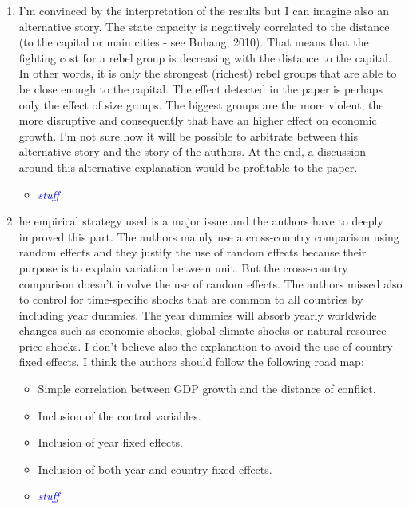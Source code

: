 \documentclass[12pt,onesided,fullpage]{amsart}
\begin{document}
\begin{enumerate}

\item  I’m convinced by the interpretation of the results but I can imagine also an alternative story. The state capacity is negatively correlated to the distance (to the capital or main cities - see Buhaug, 2010). That means that the fighting cost for a rebel group is decreasing with the distance to the capital. In other words, it is only the strongest (richest) rebel groups that are able to be close enough to the capital. The effect detected in the paper is perhaps only the effect of size groups. The biggest groups are the more violent, the more disruptive and consequently that have an higher effect on economic growth. I’m not sure how it will be possible to arbitrate between this alternative story and the story of the authors. At the end, a discussion around this alternative explanation would be profitable to the paper.

\begin{itemize}
\item \textcolor{blue}{\emph{stuff}}
\end{itemize}

\item he empirical strategy used is a major issue and the authors have to deeply improved this part. The authors mainly use a cross-country comparison using random effects and they justify the use of random effects because their purpose is to explain variation between unit. But the cross-country comparison doesn’t involve the use of random effects. The authors missed also to control for time-specific shocks that are common to all countries by including year dummies. The year dummies will absorb yearly worldwide changes such as economic shocks, global climate shocks or natural resource price shocks. I don’t believe also the explanation to avoid the use of country fixed effects. I think the authors should follow the following road map:
\begin{itemize}
\item Simple correlation between GDP growth and the distance of conflict.
\item Inclusion of the control variables.
\item Inclusion of year fixed effects.
\item Inclusion of both year and country fixed effects.
\end{itemize}

\begin{itemize}
\item \textcolor{blue}{\emph{stuff}}
\end{itemize}


\end{enumerate}
\end{document}
